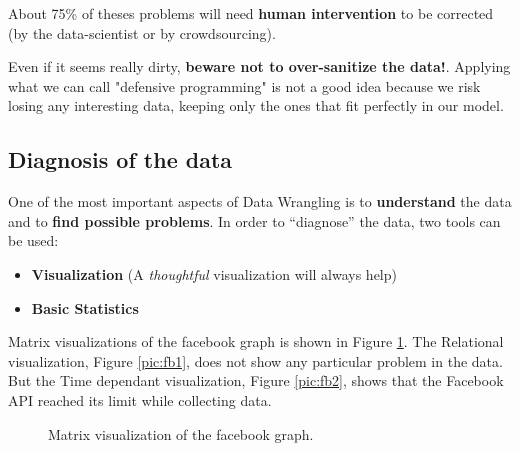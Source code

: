 About 75\% of theses problems will need \textbf{human intervention} to be corrected (by the data-scientist or by crowdsourcing).

Even if it seems really dirty, \textbf{beware not to over-sanitize the data!}. Applying what we can call "defensive programming" is not a good idea because we risk losing any interesting data, keeping only the ones that fit perfectly in our model.

\subsection{Diagnosis of the data}

One of the most important aspects of Data Wrangling is to {\bf understand} the data and to {\bf find possible problems}. In order to ``diagnose'' the data, two tools can be used:
\begin{itemize}
 \item {\bf Visualization} (A {\it thoughtful} visualization will always help)
 \item {\bf Basic Statistics} 
\end{itemize}

Matrix visualizations of the facebook graph is shown in Figure \ref{pic:fb}. The Relational visualization, Figure \ref{pic:fb1}, does not show any particular problem in the data. But the Time dependant visualization, Figure \ref{pic:fb2}, shows that the Facebook API reached its limit while collecting data.

\begin{figure} [h] %
\centerline{
}
\caption{\label{pic:fb} Matrix visualization of the facebook graph.} 
\end{figure}


